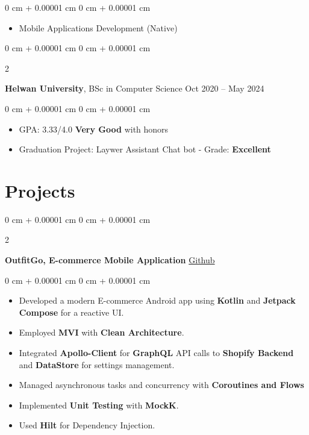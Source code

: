 \documentclass[10pt, letterpaper]{article}
\newenvironment{highlights}{
    \begin{itemize}[
        topsep=0.10 cm,
        parsep=0.10 cm,
        partopsep=0pt,
        itemsep=0pt,
        leftmargin=0 cm + 10pt
    ]
}{
    \end{itemize}
} %
\newenvironment{onecolentry}{
    \begin{adjustwidth}{
        0 cm + 0.00001 cm
    }{
        0 cm + 0.00001 cm
    }
}{
    \end{adjustwidth}
} %
\newenvironment{twocolentry}[2][]{
    \onecolentry
    \def\secondColumn{#2}
    \setcolumnwidth{\fill, 4.5 cm}
    \begin{paracol}{2}
}{
    \switchcolumn \raggedleft \secondColumn
    \end{paracol}
    \endonecolentry
} %
\begin{document}
        \vspace{0.10 cm}
        \begin{onecolentry}
            \begin{highlights}
                \item Mobile Applications Development (Native)
            \end{highlights}
        \end{onecolentry}


        \vspace{0.2 cm}

        \begin{twocolentry}{
            Oct 2020 – May 2024
        }
            \textbf{Helwan University}, BSc in Computer Science\end{twocolentry}

        \vspace{0.10 cm}
        \begin{onecolentry}
            \begin{highlights}
                \item GPA: 3.33/4.0 \textbf{Very Good} with honors
                \item Graduation Project: Laywer Assistant Chat bot - Grade: \textbf{Excellent}
            \end{highlights}
        \end{onecolentry}



    
    \section{Projects}



        
        \begin{twocolentry}{
            \href{https://github.com/OutfitGo/OutfitGo-Client}{Github}
        }
            \textbf{OutfitGo, E-commerce Mobile Application}\end{twocolentry}

        \vspace{0.10 cm}
        \begin{onecolentry}
            \begin{highlights}
                \item Developed a modern E-commerce Android app using \textbf{Kotlin} and \textbf{Jetpack Compose} for a reactive UI.
                \item Employed \textbf{MVI} with \textbf{Clean Architecture}.
                \item Integrated \textbf{Apollo-Client} for \textbf{GraphQL} API calls to \textbf{Shopify Backend} and \textbf{DataStore} for settings management.
                \item Managed asynchronous tasks and concurrency with \textbf{Coroutines and Flows}
                \item Implemented \textbf{Unit Testing} with \textbf{MockK}.
                \item Used \textbf{Hilt} for Dependency Injection.
            \end{highlights}
        \end{onecolentry}
\end{document}
